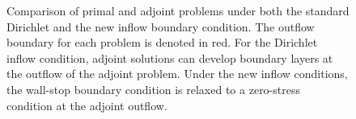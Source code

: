 \documentclass[11pt,onecolumn]{scrartcl}
\begin{document}
\begin{figure}
\caption{Comparison of primal and adjoint problems under both the standard Dirichlet and the new inflow boundary condition. The outflow boundary for each problem is denoted in red. For the Dirichlet inflow condition, adjoint solutions can develop boundary layers at the outflow of the adjoint problem. Under the new inflow conditions, the wall-stop boundary condition is relaxed to a zero-stress condition at the adjoint outflow.}
\end{figure}
\end{document}
